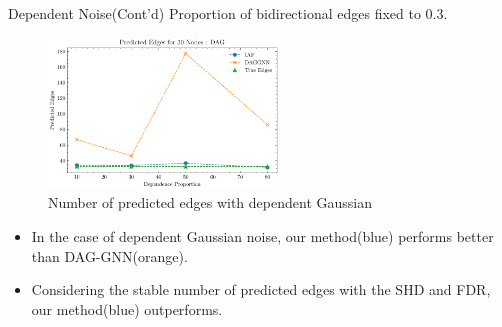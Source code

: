 \documentclass{beamer}
\begin{document}
\begin{frame}{Dependent Noise(Cont'd)}
    Proportion of bidirectional edges fixed to 0.3.
    \begin{figure}
        \centering
        \includegraphics[height=4cm]{fig/Predicted Edges_dependence_30_DAG_threshold0.3.pdf}
        \caption{Number of predicted edges with dependent Gaussian}
        \label{fig:dep_gaussian_edges}
    \end{figure}
    \begin{itemize}
        \item In the case of dependent Gaussian noise, our method(blue) performs better than DAG-GNN(orange).
        \item Considering the stable number of predicted edges with the SHD and FDR, our method(blue) outperforms.
    \end{itemize}
\end{frame}
\end{document}
